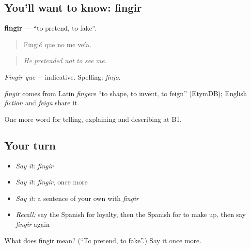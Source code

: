 \subsection*{You'll want to know: fingir}
\textbf{fingir} — \textquotedblleft{}to pretend, to fake\textquotedblright{}.

\begin{quote}
Fingió que no me veía.
\end{quote}

\begin{quote}
\emph{He pretended not to see me.}
\end{quote}

\emph{Fingir que} + indicative. Spelling: \emph{finjo}.

\begin{cousinweb}
\emph{fingir} comes from Latin \emph{fingere} \textquotedblleft{}to shape, to invent, to feign\textquotedblright{} (EtymDB); English \emph{fiction} and \emph{feign} share it.
\end{cousinweb}

\begin{grammarlens}[title={What you've built}]
One more word for telling, explaining and describing at B1.
\end{grammarlens}

\subsection*{Your turn}
\begin{itemize}
\raggedright
  \item \emph{Say it:} \emph{fingir}
  \item \emph{Say it:} \emph{fingir}, once more
  \item \emph{Say it:} a sentence of your own with \emph{fingir}
  \item \emph{Recall:} say the Spanish for loyalty, then the Spanish for to make up, then say \emph{fingir} again
\end{itemize}

\begin{tcolorbox}[breakable,colback=teal!4,colframe=teal!35!black,title={Before you move on}]
What does fingir mean? (\textquotedblleft{}To pretend, to fake\textquotedblright{}.) Say it once more.
\end{tcolorbox}
